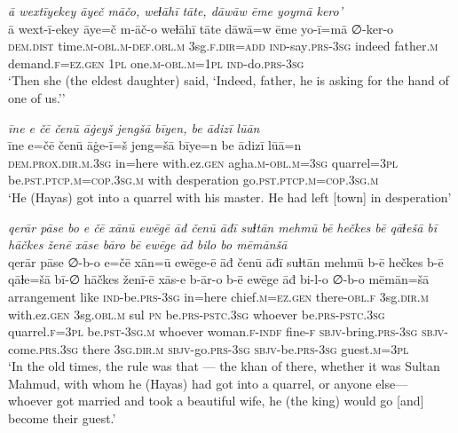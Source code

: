 \ea \label{ŽH.57}
\textit{ā wextīyekey āyeč māčo, weɫāhī tāte, dāwāw ēme yoymā kero’} \\ 
\gll ā wext-ī-ekey āye=č m-āč-o weɫāhī tāte dāwā=w ēme yo-ī=mā ∅-ker-o \\ 
 \textsc{dem.dist} time\textsc{.m}\textsc{-obl}\textsc{.m}\textsc{-def}\textsc{.obl}\textsc{.m} 3sg\textsc{\textsc{.f}}\textsc{.dir}\textsc{=add} \textsc{ind-}say\textsc{.prs}\textsc{-3sg} indeed father\textsc{.m} demand\textsc{\textsc{.f}}\textsc{=ez}\textsc{.gen} \textsc{1pl} one\textsc{.m}\textsc{-obl}\textsc{.m}\textsc{=1pl} \textsc{ind-}do\textsc{.prs}\textsc{-3sg} \\ 
\glt `Then she (the eldest daughter) said, ‘Indeed, father, he is asking for the hand of one of us.’'
\z 
 
\ea \label{ŽH.62}
\textit{īne e čē čenū āġeyš jengšā bīyen, be ādizī lūān} \\ 
\gll īne e=čē čenū āġe-ī=š jeng=šā bīye=n be ādizī lūā=n \\ 
 \textsc{dem.prox}\textsc{.dir}\textsc{.m}\textsc{.3sg} in=here with.ez\textsc{.gen} agha\textsc{.m}\textsc{-obl}\textsc{.m}\textsc{=3sg} quarrel\textsc{=3pl} be\textsc{.pst}\textsc{.ptcp}\textsc{.m}\textsc{=cop}\textsc{.3sg}\textsc{.m} with desperation go\textsc{.pst}\textsc{.ptcp}\textsc{.m}\textsc{=cop}\textsc{.3sg}\textsc{.m} \\ 
\glt `He (Hayas) got into a quarrel with his master. He had left [town] in desperation'
\z 
 
\ea \label{ŽH.64}
\textit{qerār pāse bo e čē xānū ewēgē āđ čenū āđī suɫtān mehmū bē hečkes bē qāɫešā bī hāčkes ženē xāse bāro bē ewēge āđ bilo bo mēmānšā} \\ 
\gll qerār pāse ∅-b-o e=čē xān=ū ewēge-ē āđ čenū āđī suɫtān mehmū b-ē hečkes b-ē qāɫe=šā bī-∅ hāčkes ženī-ē xās-e b-ār-o b-ē ewēge āđ bi-l-o ∅-b-o mēmān=šā \\ 
 arrangement like \textsc{ind-}be\textsc{.prs}\textsc{-3sg} in=here chief\textsc{.m}\textsc{=ez}\textsc{.gen} there\textsc{-obl}\textsc{\textsc{.f}} 3sg\textsc{.dir}\textsc{.m} with.ez\textsc{.gen} 3sg\textsc{.obl}\textsc{.m} sul \textsc{pn} be\textsc{.prs}\textsc{-pstc}\textsc{.3sg} whoever be\textsc{.prs}\textsc{-pstc}\textsc{.3sg} quarrel\textsc{\textsc{.f}}\textsc{=3pl} be\textsc{.pst}\textsc{-3sg}\textsc{.m} whoever woman\textsc{\textsc{.f}}\textsc{-indf} fine\textsc{-f} \textsc{sbjv-}bring\textsc{.prs}\textsc{-3sg} \textsc{sbjv-}come\textsc{.prs}\textsc{.3sg} there \textsc{3sg}\textsc{.dir}\textsc{.m} \textsc{sbjv-}go\textsc{.prs}\textsc{-3sg} \textsc{sbjv-}be\textsc{.prs}\textsc{-3sg} guest\textsc{.m}\textsc{=3pl} \\ 
\glt `In the old times, the rule was that — the khan of there, whether it was Sultan Mahmud, with whom he (Hayas) had got into a quarrel, or anyone else— whoever got married and took a beautiful wife, he (the king) would go [and] become their guest.'
\z 
 
